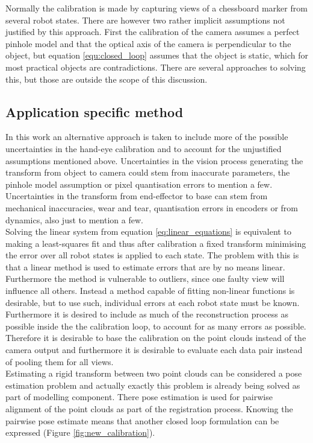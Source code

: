 \noindent Normally the calibration is made by capturing views of a chessboard marker from several robot states. There are however two rather implicit assumptions \cite{Horaud1995} not justified by this approach. First the calibration of the camera assumes a perfect pinhole model and that the optical axis of the camera is perpendicular to the object, but equation \ref{equ:closed_loop} assumes that the object is static, which for most practical objects are contradictions. There are several approaches to solving this, but those are outside the scope of this discussion. 


\subsection{Application specific method}
In this work an alternative approach is taken to include more of the possible uncertainties in the hand-eye calibration and to account for the unjustified assumptions mentioned above. Uncertainties in the vision process generating the transform from object to camera could stem from inaccurate parameters, the pinhole model assumption or pixel quantisation errors to mention a few. Uncertainties in the transform from end-effector to base can stem from mechanical inaccuracies, wear and tear, quantisation errors in encoders or from dynamics, also just to mention a few. \\

\noindent Solving the linear system from equation \ref{eq:linear_equations} is equivalent to making a least-squares fit and thus after calibration a fixed transform minimising the error over all robot states is applied to each state. The problem with this is that a linear method is used to estimate errors that are by no means linear. Furthermore the method is vulnerable to outliers, since one faulty view will influence all others. Instead a method capable of fitting non-linear functions is desirable, but to use such, individual errors at each robot state must be known. Furthermore it is desired to include as much of the reconstruction process as possible inside the the calibration loop, to account for as many errors as possible. Therefore it is desirable to base the calibration on the point clouds instead of the camera output and furthermore it is desirable to evaluate each data pair instead of pooling them for all views.\\

\noindent Estimating a rigid transform between two point clouds can be considered a pose estimation problem and actually exactly this problem is already being solved as part of  modelling component. There pose estimation is used for pairwise alignment of the point clouds as part of the registration process. Knowing the pairwise pose estimate means that another closed loop formulation can be expressed (Figure \ref{fig:new_calibration}). \\

